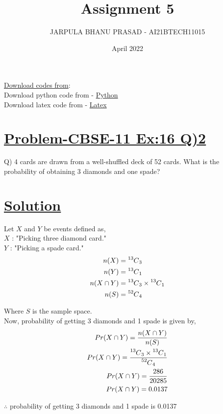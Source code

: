 \documentclass[journal,12pt,twocolumn]{IEEEtran}
\title{Assignment 5}
\author{JARPULA BHANU PRASAD - AI21BTECH11015}
\date{April 2022}
\newcommand\Mycomb[2][^n]{\prescript{#1\mkern-0.5mu}{}C_{#2}}
\begin{document}
\maketitle
\noindent \Large\underline{Download codes from}:\\
\noindent \large Download python code from - \href{https://github.com/jarpula-Bhanu/Assignment-5/blob/main/codes/verify.py}{Python}\\ Download latex code from - \href{https://github.com/jarpula-Bhanu/Assignment-5/blob/main/Assignment5.tex}{Latex}
\section{\large\underline{Problem-CBSE-11 Ex:16 Q)2}}
\large \noindent Q) 4 cards are drawn from a well-shuffled deck of 52 cards. What is the probability of obtaining 3 diamonds and one spade?
\section{\large\underline{Solution}}
\noindent Let $X$ and $Y$ be events defined as, \\
$X$ : "Picking three diamond card." \\
$Y$ : "Picking a spade card." \\
\begin{align}
n(X) &= \Mycomb[13]{3} \\
n(Y) &= \Mycomb[13]{1} \\
n(X \cap Y) &= \Mycomb[13]{3} \times \Mycomb[13]{1} \\
n(S) &= \Mycomb[52]{4} 
\end{align}

Where $S$ is the sample space. \\

Now, probability of getting 3 diamonds and 1 spade is given by,
\begin{align}
Pr(X \cap Y) = \frac{n(X \cap Y)}{n(S)} \\
Pr(X \cap Y) = \frac{\Mycomb[13]{3} \times \Mycomb[13]{1}}{\Mycomb[52]{4}} \\
Pr(X \cap Y) = \frac{286}{20285} \\
Pr(X \cap Y) = 0.0137 
\end{align}

$\therefore$ probability of getting 3 diamonds and 1 spade is 0.0137
\end{document}
